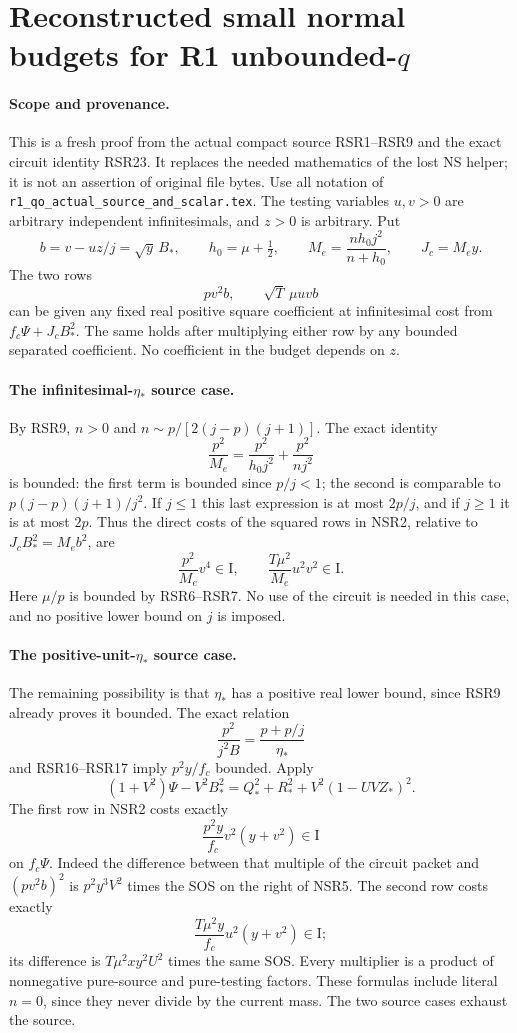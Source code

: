 \section{Reconstructed small normal budgets for R1 unbounded-$q$}
\label{sec:reconstructed-r1-qo-small-normal-budgets}

\paragraph{Scope and provenance.}
This is a fresh proof from the actual compact source RSR1--RSR9 and
the exact circuit identity RSR23. It replaces the needed mathematics
of the lost NS helper; it is not an assertion of original file bytes.
Use all notation of \texttt{r1\_qo\_actual\_source\_and\_scalar.tex}.
The testing variables $u,v>0$ are arbitrary independent infinitesimals,
and $z>0$ is arbitrary. Put
\[
 b=v-uz/j=\sqrt y\,B_*,\qquad
 h_0=\mu+\tfrac12,\qquad
 M_e=\frac{nh_0j^2}{n+h_0},\qquad J_c=M_ey.
 \tag{NSR1}
\]
The two rows
\[
       p v^2b,\qquad \sqrt T\,\mu u v b
 \tag{NSR2}
\]
can be given any fixed real positive square coefficient at
infinitesimal cost from $f_c\Psi+J_cB_*^2$. The same holds after
multiplying either row by any bounded separated coefficient.
No coefficient in the budget depends on $z$.

\paragraph{The infinitesimal-$\eta_*$ source case.}
By RSR9, $n>0$ and
$n\sim p/[2(j-p)(j+1)]$. The exact identity
\[
 \frac{p^2}{M_e}
 =\frac{p^2}{h_0j^2}+\frac{p^2}{nj^2}
 \tag{NSR3}
\]
is bounded: the first term is bounded since $p/j<1$; the second
is comparable to $p(j-p)(j+1)/j^2$. If $j\leq1$ this last expression
is at most $2p/j$, and if $j\geq1$ it is at most $2p$.
Thus the direct costs of the squared rows in NSR2, relative to
$J_cB_*^2=M_eb^2$, are
\[
 \frac{p^2}{M_e}v^4\in\mathrm I,\qquad
 \frac{T\mu^2}{M_e}u^2v^2\in\mathrm I.
 \tag{NSR4}
\]
Here $\mu/p$ is bounded by RSR6--RSR7. No use of the circuit is
needed in this case, and no positive lower bound on $j$ is imposed.

\paragraph{The positive-unit-$\eta_*$ source case.}
The remaining possibility is that $\eta_*$ has a positive real lower
bound, since RSR9 already proves it bounded. The exact relation
\[
 \frac{p^2}{j^2B}=\frac{p+p/j}{\eta_*}
\]
and RSR16--RSR17 imply $p^2y/f_c$ bounded. Apply
\[
 (1+V^2)\Psi-V^2B_*^2
       =Q_*^2+R_*^2+V^2(1-UVZ_*)^2.
 \tag{NSR5}
\]
The first row in NSR2 costs exactly
\[
 \frac{p^2y}{f_c}v^2(y+v^2)\in\mathrm I
\]
on $f_c\Psi$. Indeed the difference between that multiple of the
circuit packet and $(pv^2b)^2$ is $p^2y^3V^2$ times the SOS on
the right of NSR5. The second row costs exactly
\[
 \frac{T\mu^2y}{f_c}u^2(y+v^2)\in\mathrm I;
\]
its difference is $T\mu^2xy^2U^2$ times the same SOS. Every
multiplier is a product of nonnegative pure-source and pure-testing
factors. These formulas include literal $n=0$, since they never
divide by the current mass. The two source cases exhaust the source.

